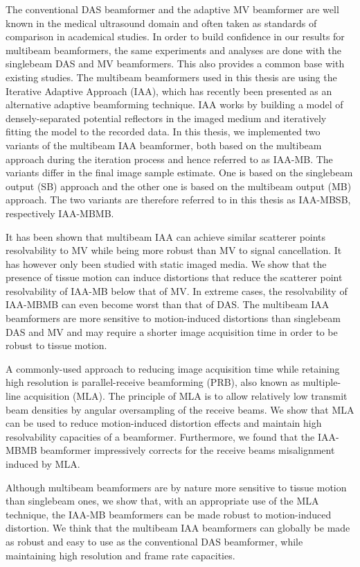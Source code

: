 The conventional DAS beamformer and the adaptive MV beamformer are well known in the medical ultrasound domain and often taken as standards of comparison in academical studies.
In order to build confidence in our results for multibeam beamformers, the same experiments and analyses are done with the singlebeam DAS and MV beamformers. This also provides a common base with existing studies.
The multibeam beamformers used in this thesis are using the Iterative Adaptive Approach (IAA), which has recently been presented as an alternative adaptive beamforming technique.
IAA works by building a model of densely-separated potential reflectors in the imaged medium and iteratively fitting the model to the recorded data.
In this thesis, we implemented two variants of the multibeam IAA beamformer, both based on the multibeam approach during the iteration process and hence referred to as IAA-MB.
The variants differ in the final image sample estimate. One is based on the singlebeam output (SB) approach and the other one is based on the multibeam output (MB) approach.
The two variants are therefore referred to in this thesis as IAA-MBSB, respectively IAA-MBMB.

It has been shown that multibeam IAA can achieve similar scatterer points resolvability to MV while being more robust than MV to signal cancellation.
It has however only been studied with static imaged media.
We show that the presence of tissue motion can induce distortions that reduce the scatterer point resolvability of IAA-MB below that of MV.
In extreme cases, the resolvability of IAA-MBMB can even become worst than that of DAS.
The multibeam IAA beamformers are more sensitive to motion-induced distortions than singlebeam DAS and MV and may require a shorter image acquisition time in order to be robust to tissue motion.

A commonly-used approach to reducing image acquisition time while retaining high resolution is parallel-receive beamforming (PRB), also known as multiple-line acquisition (MLA).
The principle of MLA is to allow relatively low transmit beam densities by angular oversampling of the receive beams.
We show that MLA can be used to reduce motion-induced distortion effects and maintain high resolvability capacities of a beamformer.
Furthermore, we found that the IAA-MBMB beamformer impressively corrects for the receive beams misalignment induced by MLA.

Although multibeam beamformers are by nature more sensitive to tissue motion than singlebeam ones, we show that, with an appropriate use of the MLA technique, the IAA-MB beamformers can be made robust to motion-induced distortion.
We think that the multibeam IAA beamformers can globally be made as robust and easy to use as the conventional DAS beamformer, while maintaining high resolution and frame rate capacities.

